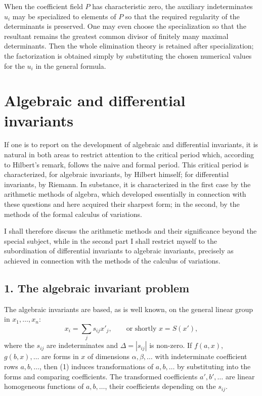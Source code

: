 \documentclass[11pt]{article}
\begin{document}
When the coefficient field $P$ has characteristic zero, the auxiliary indeterminates $u_i$ may be specialized to elements of $P$ so that the required regularity of the determinants is preserved. One may even choose the specialization so that the resultant remains the greatest common divisor of finitely many maximal determinants. Then the whole elimination theory is retained after specialization; the factorization is obtained simply by substituting the chosen numerical values for the $u_i$ in the general formula.

\newpage

\section{Algebraic and differential invariants}

If one is to report on the development of algebraic and differential invariants, it is natural in both areas to restrict attention to the critical period which, according to Hilbert's remark, follows the naive and formal period. This critical period is characterized, for algebraic invariants, by Hilbert himself; for differential invariants, by Riemann. In substance, it is characterized in the first case by the arithmetic methods of algebra, which developed essentially in connection with these questions and here acquired their sharpest form; in the second, by the methods of the formal calculus of variations.

I shall therefore discuss the arithmetic methods and their significance beyond the special subject, while in the second part I shall restrict myself to the subordination of differential invariants to algebraic invariants, precisely as achieved in connection with the methods of the calculus of variations.

\subsection{1. The algebraic invariant problem}

The algebraic invariants are based, as is well known, on the general linear group in $x_1,\ldots,x_n$:
\begin{equation}
  x_i=\sum_j s_{ij}x'_j, \qquad \text{or shortly } x=S(x'),          \tag{1}
\end{equation}
where the $s_{ij}$ are indeterminates and $\Delta=|s_{ij}|$ is non-zero. If $f(a,x)$, $g(b,x),\ldots$ are forms in $x$ of dimensions $\alpha,\beta,\ldots$ with indeterminate coefficient rows $a,b,\ldots$, then (1) induces transformations of $a,b,\ldots$ by substituting into the forms and comparing coefficients. The transformed coefficients $a',b',\ldots$ are linear homogeneous functions of $a,b,\ldots$, their coefficients depending on the $s_{ij}$.
\end{document}

